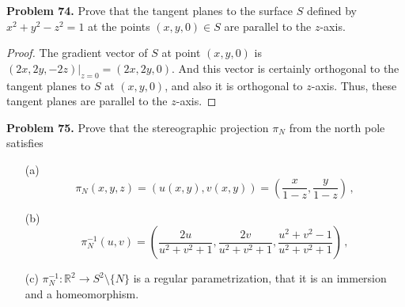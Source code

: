 \documentclass[11pt]{article}
\theoremstyle{definition}
\theoremstyle{definition}
\begin{document}
\medskip


\noindent
{\bf Problem 74.}
Prove that the tangent planes to the surface $S$ defined by $x^2+y^2-z^2=1$ at the points
$(x,y,0)\in S$ are parallel to the $z$-axis.
\begin{proof}
The gradient vector of $S$ at point $(x,y,0)$ is $(2x, 2y, -2z)|_{z=0} = (2x,2y,0)$. And this vector is certainly orthogonal to the tangent planes to $S$ at $(x,y,0)$, and also it is orthogonal to $z$-axis. Thus, these tangent planes are parallel to the $z$-axis.
\end{proof}


\medskip


\noindent
{\bf Problem 75.}
Prove that the stereographic projection $\pi_N$ from the north pole satisfies
\begin{enumerate}
	\item[(a)]
	$$
	\pi_N(x,y,z)=(u(x,y),v(x,y))=\left(\frac{x}{1-z},\frac{y}{1-z}\right)\, ,
	$$
	\item[(b)]
	$$
	\pi_N^{-1}(u,v)=\left(\frac{2u}{u^2+v^2+1},\frac{2v}{u^2+v^2+1},\frac{u^2+v^2-1}{u^2+v^2+1}\right)\, ,
	$$
	\item[(c)]
	$\pi_N^{-1}:\mathbb{R}^2\to S^2\setminus\{ N\}$ is a regular parametrization, that it is an immersion and a homeomorphism.
\end{enumerate}
\end{document}
